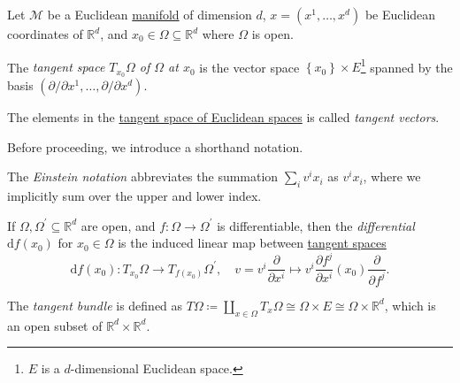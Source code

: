 \begin{definition*}
	Let \(\mathcal{M} \) be a Euclidean \hyperref[def:topological-manifold]{manifold} of dimension \(d\), \(x = (x^1, \dots , x^d)\) be Euclidean coordinates of \(\mathbb{R} ^d\), and \(x_0\in \Omega \subseteq \mathbb{R} ^d\) where \(\Omega \) is open.
	\begin{definition}\label{def:tangent-space-of-Euclidean-space}
		The \emph{tangent space \(T_{x_0}\Omega \) of \(\Omega \) at \(x_0\)} is the vector space \(\left\{ x_0 \right\} \times E\)\footnote{\(E\) is a \(d\)-dimensional Euclidean space.} spanned by the basis \((\partial / \partial x^1, \dots , \partial / \partial x^d)\).
	\end{definition}
	\begin{definition}\label{def:tangent-vector-of-Euclidean-space}
		The elements in the \hyperref[def:tangent-space-of-Euclidean-space]{tangent space of Euclidean spaces} is called \emph{tangent vectors}.
	\end{definition}
\end{definition*}

Before proceeding, we introduce a shorthand notation.

\begin{notation}
	The \emph{Einstein notation} abbreviates the summation \(\sum_{i} v^i x_i\) as \(v^i x_i\), where we implicitly sum over the upper and lower index.
\end{notation}

\begin{definition}\label{def:differential-of-Euclidean-space}
	If \(\Omega , \Omega ^{\prime} \subseteq \mathbb{R} ^d\) are open, and \(f\colon \Omega \to \Omega ^\prime \) is differentiable, then the \emph{differential} \(\mathrm{d} f(x_0)\) for \(x_0 \in \Omega \) is the induced linear map between \hyperref[def:tangent-space-of-Euclidean-space]{tangent spaces}
	\[
		\mathrm{d} f(x_0) \colon T_{x_0}\Omega \to T_{f(x_0)}\Omega ^\prime,\quad
		v = v^i \frac{\partial }{\partial x^i} \mapsto v^i \frac{\partial f^j}{\partial x^i} (x_0) \frac{\partial }{\partial f^j}.
	\]
\end{definition}

\begin{definition}\label{def:tangent-bundle-of-Euclidean-space}
	The \emph{tangent bundle} is defined as \(T \Omega \coloneqq \coprod_{x\in \Omega } T_x \Omega \cong \Omega \times E \cong \Omega \times \mathbb{R} ^d\), which is an open subset of \(\mathbb{R} ^d \times \mathbb{R} ^d\).
\end{definition}

